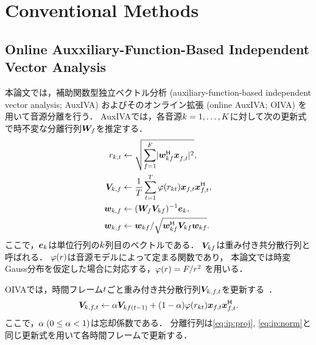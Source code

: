 \documentclass[sip,biber]{now-journal}
\begin{document}
\section{Conventional Methods}\label{sec:conventional}

\subsection{Online Auxxiliary-Function-Based Independent Vector Analysis}

本論文では，補助関数型独立ベクトル分析 (auxiliary-function-based independent vector analysis; AuxIVA) \cite{Ono:2011:WASPAA}
およびそのオンライン拡張 (online AuxIVA; OIVA) \cite{Taniguchi:2014:HSCMA} を用いて音源分離を行う．
AuxIVAでは，各音源$k = 1, \dots, K$に対して次の更新式で時不変な分離行列$\bm{W} _{f}$を推定する．
\begin{align}
  \var _{\src,\tframe} &\gets \sqrt{\sum _{\freq=1} ^{\Freq} \lvert \demix ^{\hermite} _{\src\freq} \Obs ^{\nohermite}_{\ft} \rvert ^2}, \\
  \cov _{\src,\freq} &\gets \frac{1}{\Tframe} \sum _{\tframe=1} ^{\Tframe} \weight (\var_{\src\tframe}) \Obs _{\ft} \Obs _{\ft}^{\hermite}, \\
  \demix _{\src,\freq} &\gets (\Demix _{\freq} \cov _{\src\freq}) ^{-1} \eye _{\src} \label{eq:ip:proj}, \\
  \demix _{\src,\freq} &\gets {\demix _{\src\freq}} / {\sqrt{\demix _{\src\freq} ^{\hermite} \cov _{\src\freq} \demix _{\src\freq}}} \label{eq:ip:norm}.
\end{align}
ここで，$\bm{e} _{k}$は単位行列の$k$列目のベクトルである．
$\bm{V} _{kf}$は{重み付き共分散行列}と呼ばれる．
$\varphi(r)$は音源モデルによって定まる関数であり，
本論文では時変Gauss分布を仮定した場合に対応する，$\varphi (r) = F/{r ^2}$ \cite{Ono:2012:APSIPA}を用いる．

OIVAでは，時間フレーム$t$ごと重み付き共分散行列$\cov _{\src,\ft}$を更新する~\cite{Taniguchi:2014:HSCMA}．
\begin{equation}
  \cov _{\src,\ft} \gets \forget \cov _{\src\freq(\tframe-1)} + (1 - \forget) \weight ({\var _{\src\tframe}}) \Obs _{\ft} \Obs _{\ft}^{\hermite}.
\end{equation}
ここで，$\alpha\; (0 \leq \alpha < 1)$は忘却係数である．
分離行列は\cref{eq:ip:proj}, \cref{eq:ip:norm}と同じ更新式を用いて各時間フレームで更新する．
\end{document}
